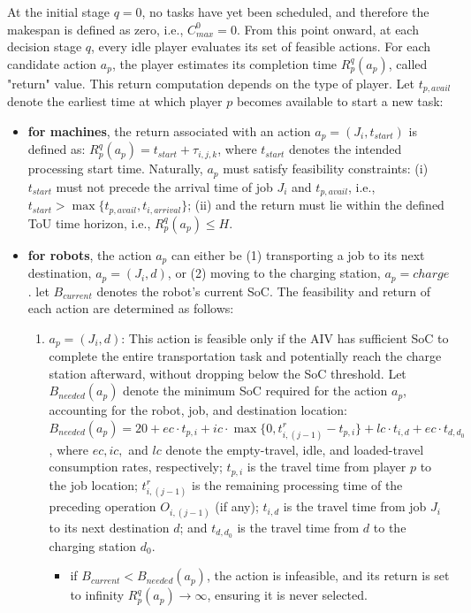 \documentclass[preprint, 3p, review, 12pt]{elsarticle}
\begin{document}
At the initial stage $q=0$, no tasks have yet been scheduled, and therefore the makespan is defined as zero, i.e., $C_{max}^{0}=0$. From this point onward, at each decision stage $q$, every idle player evaluates its set of feasible actions. For each candidate action $a_p$, the player estimates its completion time $R^q_p(a_p)$, called "return" value. This return computation depends on the type of player. Let $t_{p, avail}$ denote the earliest time at which player $p$ becomes available to start a new task:
\begin{itemize}
    \item \textbf{for machines}, the return associated with an action $a_p = (J_i, t_{start})$ is defined as: $R_p^q(a_p) = t_{start} + \tau_{i,j,k}$, where $t_{start}$ denotes the intended processing start time. Naturally, $a_p$ must satisfy feasibility constraints: (i) $t_{start}$ must not precede the arrival time of job $J_i$ and $t_{p, avail}$, i.e., $t_{start}>\max{\{t_{p, avail}, t_{i, arrival}\}}$; (ii) and the return must lie within the defined ToU time horizon, i.e., $R_p^q(a_p) \leq H$.
    \item \textbf{for robots}, the action $a_p$ can either be (1) transporting a job to its next destination, $a_p = (J_i, d)$, or (2) moving to the charging station, $a_p = charge$. let $B_{current}$ denotes the robot's current SoC. The feasibility and return of each action are determined as follows:
    \begin{enumerate}
        \item $a_p = (J_i, d)$: This action is feasible only if the AIV has sufficient SoC to complete the entire transportation task and potentially reach the charge station afterward, without dropping below the SoC threshold. Let $B_{needed}(a_p)$ denote the minimum SoC required for the action $a_p$, accounting for the robot, job, and destination location: $B_{needed}(a_p) = 20 + ec \cdot t_{p,i} + ic \cdot \max\{0, t^r_{i,(j-1)} - t_{p,i}\} + lc \cdot t_{i,d} + ec \cdot t_{d,d_0}$, where $ec, ic,$ and $lc$ denote the empty-travel, idle, and loaded-travel consumption rates, respectively; $t_{p,i}$ is the travel time from player $p$ to the job location; $t^r_{i,(j-1)}$ is the remaining processing time of the preceding operation $O_{i,(j-1)}$ (if any); $t_{i,d}$ is the travel time from job $J_i$ to its next destination $d$; and $t_{d,d_0}$ is the travel time from $d$ to the charging station $d_0$.
        \begin{itemize}
            \item if $B_{current} < B_{needed}(a_p)$, the action is infeasible, and its return is set to infinity $R_p^q(a_p) \longrightarrow \infty$, ensuring it is never selected.

\end{itemize}
\end{enumerate}
\end{itemize}
\end{document}
